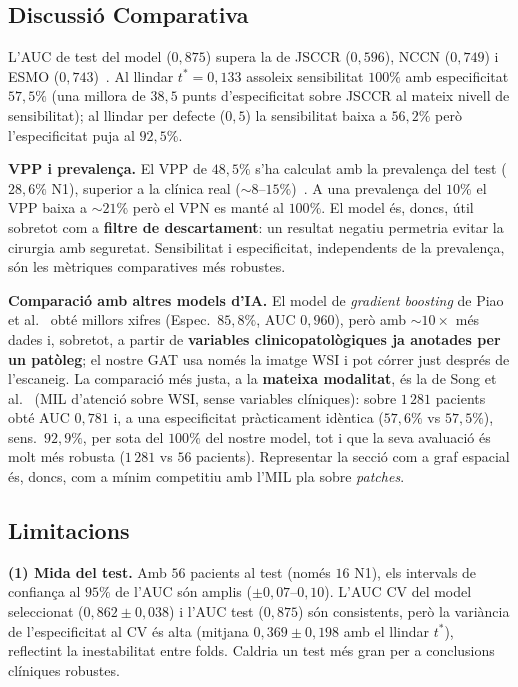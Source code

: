 \documentclass[10pt,a4paper,twocolumn,twoside]{article}
\begin{document}
\subsection{Discussió Comparativa}

L'AUC de test del model ($0{,}875$) supera la de JSCCR ($0{,}596$), NCCN ($0{,}749$) i
ESMO ($0{,}743$)~\cite{tanino2024comparative}. Al llindar $t^*\!=\!0{,}133$ assoleix
sensibilitat $100\%$ amb especificitat $57{,}5\%$ (una millora de $38{,}5$ punts
d'especificitat sobre JSCCR al mateix nivell de sensibilitat); al llindar per defecte
($0{,}5$) la sensibilitat baixa a $56{,}2\%$ però l'especificitat puja al $92{,}5\%$.

\textbf{VPP i prevalença.} El VPP de $48{,}5\%$ s'ha calculat amb la prevalença del test
($28{,}6\%$ N1), superior a la clínica real ($\sim\!8$–$15\%$)~\cite{zaffalon2023}. A una
prevalença del $10\%$ el VPP baixa a $\sim\!21\%$ però el VPN es manté al $100\%$. El model
és, doncs, útil sobretot com a \textbf{filtre de descartament}: un resultat negatiu permetria
evitar la cirurgia amb seguretat. Sensibilitat i especificitat, independents de la prevalença,
són les mètriques comparatives més robustes.

\textbf{Comparació amb altres models d'IA.} El model de \textit{gradient boosting} de Piao et
al.~\cite{piao2023ai} obté millors xifres (Espec.\ $85{,}8\%$, AUC $0{,}960$), però amb
$\sim\!10\!\times$ més dades i, sobretot, a partir de \textbf{variables clinicopatològiques ja
anotades per un patòleg}; el nostre GAT usa només la imatge WSI i pot córrer just després de
l'escaneig. La comparació més justa, a la \textbf{mateixa modalitat}, és la de Song et
al.~\cite{song2024lnm} (MIL d'atenció sobre WSI, sense variables clíniques): sobre $1\,281$
pacients obté AUC $0{,}781$ i, a una especificitat pràcticament idèntica ($57{,}6\%$ vs
$57{,}5\%$), sens.\ $92{,}9\%$, per sota del $100\%$ del nostre model, tot i que la seva
avaluació és molt més robusta ($1\,281$ vs $56$ pacients). Representar la secció com a graf
espacial és, doncs, com a mínim competitiu amb l'MIL pla sobre \textit{patches}.

\subsection{Limitacions}
\label{sec:limitacions}

\textbf{(1) Mida del test.}
Amb $56$ pacients al test (només $16$ N1), els intervals de confiança al $95\%$ de l'AUC
són amplis ($\pm\!0{,}07$–$0{,}10$). L'AUC CV del model seleccionat ($0{,}862\!\pm\!0{,}038$)
i l'AUC test ($0{,}875$) són consistents, però la variància de l'especificitat al CV és alta
(mitjana $0{,}369\!\pm\!0{,}198$ amb el llindar $t^*$), reflectint la inestabilitat
entre folds. Caldria un test més gran per a conclusions clíniques robustes.
\end{document}
